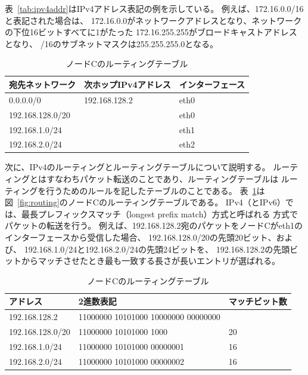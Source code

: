 表~\ref{tab:ipv4addr}はIPv4アドレス表記の例を示している。
例えば、172.16.0.0/16と表記された場合は、
172.16.0.0がネットワークアドレスとなり、ネットワークの下位16ビットすべてに1がたった
172.16.255.255がブロードキャストアドレスとなり、
/16のサブネットマスクは255.255.255.0となる。

\begin{table}
    \centering
    \caption{ノードCのルーティングテーブル} \label{tab:rttable}
    \begin{tabular}{lll}
        宛先ネットワーク & 次ホップIPv4アドレス & インターフェース \\ \hline
        0.0.0.0/0 & 192.168.128.2 & eth0 \\
        192.168.128.0/20 & & eth0 \\
        192.168.1.0/24 & & eth1 \\
        192.168.2.0/24 & & eth2 \\
    \end{tabular}
\end{table}

次に、IPv4のルーティングとルーティングテーブルについて説明する。
ルーティングとはすなわちパケット転送のことであり、ルーティングテーブルは
ルーティングを行うためのルールを記したテーブルのことである。
表~\ref{tab:rttable}は図~\ref{fig:routing}のノードCのルーティングテーブルである。
IPv4（とIPv6）では、最長プレフィックスマッチ（longest prefix match）方式と呼ばれる
方式でパケットの転送を行う。
例えば、192.168.128.2宛のパケットをノードCがeth1のインターフェースから受信した場合、
192.168.128.0/20の先頭20ビット、および、
192.168.1.0/24と192.168.2.0/24の先頭24ビットを、
192.168.128.2の先頭ビットからマッチさせたとき最も一致する長さが長いエントリが選ばれる。

\begin{table}
    \centering
    \caption{ノードCのルーティングテーブル} \label{tab:longestm}
    \begin{tabular}{lll}
        アドレス & 2進数表記 & マッチビット数 \\ \hline
        192.168.128.2 & 11000000 10101000 10000000 00000000 & \\ \hline
        192.168.128.0/20 & {\color{red}11000000 10101000 1000} & 20 \\
        192.168.1.0/24 & {\color{red}11000000 10101000} 00000001 & 16 \\
        192.168.2.0/24 & {\color{red}11000000 10101000} 00000002 & 16 \\
    \end{tabular}
\end{table}

